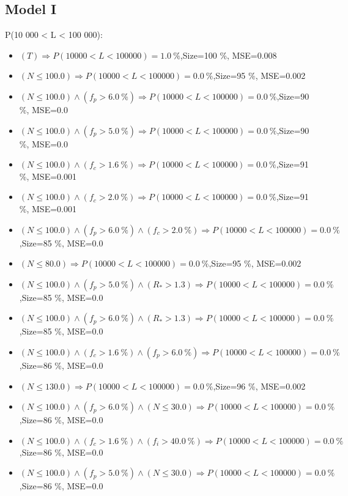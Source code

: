 \documentclass[numbered]{CSL}
\begin{document}
\subsection{Model I}
P(10 000 < L < 100 000):
\begin{itemize}
\item $(T) \Rightarrow P(10 000 < L < 100 000) = 1.0~\%$,\hfill Size=100 \%, MSE=0.008
\item $(N \leq 100.0) \Rightarrow P(10 000 < L < 100 000) = 0.0~\%$,\hfill Size=95 \%, MSE=0.002
\item $(N \leq 100.0) \land (f_p > 6.0~\%) \Rightarrow P(10 000 < L < 100 000) = 0.0~\%$,\hfill Size=90 \%, MSE=0.0
\item $(N \leq 100.0) \land (f_p > 5.0~\%) \Rightarrow P(10 000 < L < 100 000) = 0.0~\%$,\hfill Size=90 \%, MSE=0.0
\item $(N \leq 100.0) \land (f_c > 1.6~\%) \Rightarrow P(10 000 < L < 100 000) = 0.0~\%$,\hfill Size=91 \%, MSE=0.001
\item $(N \leq 100.0) \land (f_c > 2.0~\%) \Rightarrow P(10 000 < L < 100 000) = 0.0~\%$,\hfill Size=91 \%, MSE=0.001
\item $(N \leq 100.0) \land (f_p > 6.0~\%) \land (f_c > 2.0~\%) \Rightarrow P(10 000 < L < 100 000) = 0.0~\%$,\hfill Size=85 \%, MSE=0.0
\item $(N \leq 80.0) \Rightarrow P(10 000 < L < 100 000) = 0.0~\%$,\hfill Size=95 \%, MSE=0.002
\item $(N \leq 100.0) \land (f_p > 5.0~\%) \land (R_* > 1.3) \Rightarrow P(10 000 < L < 100 000) = 0.0~\%$,\hfill Size=85 \%, MSE=0.0
\item $(N \leq 100.0) \land (f_p > 6.0~\%) \land (R_* > 1.3) \Rightarrow P(10 000 < L < 100 000) = 0.0~\%$,\hfill Size=85 \%, MSE=0.0
\item $(N \leq 100.0) \land (f_c > 1.6~\%) \land (f_p > 6.0~\%) \Rightarrow P(10 000 < L < 100 000) = 0.0~\%$,\hfill Size=86 \%, MSE=0.0
\item $(N \leq 130.0) \Rightarrow P(10 000 < L < 100 000) = 0.0~\%$,\hfill Size=96 \%, MSE=0.002
\item $(N \leq 100.0) \land (f_p > 6.0~\%) \land (N \leq 30.0) \Rightarrow P(10 000 < L < 100 000) = 0.0~\%$,\hfill Size=86 \%, MSE=0.0
\item $(N \leq 100.0) \land (f_c > 1.6~\%) \land (f_i > 40.0~\%) \Rightarrow P(10 000 < L < 100 000) = 0.0~\%$,\hfill Size=86 \%, MSE=0.0
\item $(N \leq 100.0) \land (f_p > 5.0~\%) \land (N \leq 30.0) \Rightarrow P(10 000 < L < 100 000) = 0.0~\%$,\hfill Size=86 \%, MSE=0.0

\end{itemize}
\end{document}
